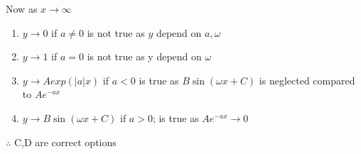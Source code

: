 \documentclass[journal,12pt,twocolumn]{IEEEtran}
\theoremstyle{remark}
\begin{document}
 Now as $x\to \infty$
 \begin{enumerate}
     \item $y \to 0$ if $a \neq 0$ is not true as $y$ depend on $a,\omega$
     \item $y \to 1 $ if $ a=0$ is not true as y depend on $\omega$
     \item $y \to Aexp(|a|x)$ if $a < 0$ is true as $ B\sin(\omega x+C)$ is neglected compared to $A e^{-ax}$
     \item $y \to B \sin(\omega x+C)$ if $a>0$; is true as $A e^{-ax} \to 0$ 
     
 \end{enumerate}
  $\therefore$ C,D are correct options
 
 
\end{document}
